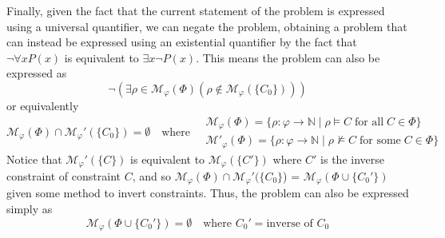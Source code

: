 Finally, given the fact that the current statement of the problem is expressed using a universal quantifier, we can negate the problem, obtaining a problem that can instead be expressed using an existential quantifier by the fact that $\neg \forall x P(x)$ is equivalent to $\exists x \neg P(x)$. This means the problem can also be expressed as 
%
\begin{equation*}
    \neg (\exists \rho \in \mathcal{M}_\varphi(\Phi) (\rho \not\in \mathcal{M}_\varphi(\{C_0\})))
\end{equation*}
or equivalently
\begin{equation*}
    \mathcal{M}_\varphi(\Phi) \cap \mathcal{M}_\varphi'(\{C_0\}) = \emptyset \quad\text{where}\quad
    \begin{matrix}
        \mathcal{M}_\varphi(\Phi)=\{\rho : \varphi \rightarrow \mathbb{N} \mid \rho \vDash C\;\text{for all}\; C \in \Phi\}\\
        \mathcal{M'}_\varphi(\Phi)=\{\rho : \varphi \rightarrow \mathbb{N} \mid \rho \not\vDash C\;\text{for some}\; C \in \Phi\}
    \end{matrix}
\end{equation*}
Notice that $\mathcal{M}_\varphi'(\{C\})$ is equivalent to $\mathcal{M}_\varphi(\{C'\})$ where $C'$ is the inverse constraint of constraint $C$, and so $\mathcal{M}_\varphi(\Phi) \cap \mathcal{M}_\varphi'(\{C_0\}$) = $\mathcal{M}_\varphi(\Phi \cup \{C_0'\})$ given some method to invert constraints. Thus, the problem can also be expressed simply as
\begin{equation*}
    \mathcal{M}_\varphi(\Phi \cup \{C_0'\}) = \emptyset \quad \text{where } C_0' = \text{inverse of } C_0
\end{equation*}

